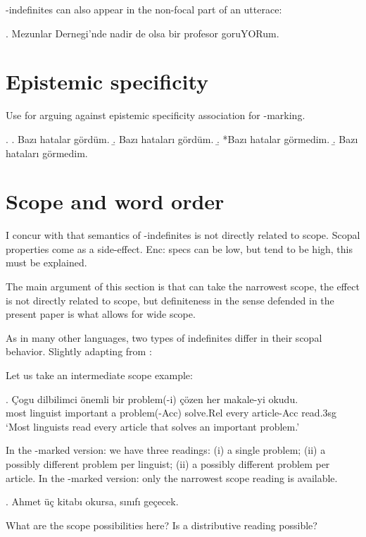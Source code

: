 \documentclass[11pt,a4paper]{article}
\begin{document}

\zero-indefinites can also appear in the non-focal part of an
utterace:

\ex.\label{exmezun}%
Mezunlar Dernegi'nde nadir de olsa bir profesor goruYORum.


\section{Epistemic specificity}

Use  for arguing against epistemic specificity
association for \acc-marking.


\ex.
\a. Bazı hatalar gördüm.
\b. Bazı hataları gördüm.
\b. *Bazı hatalar görmedim.
\b. Bazı hataları görmedim.


\section{Scope and word order}
\label{scscope}

I concur with \cite[3]{enc91} that semantics of \acc-indefinites is not
directly related to scope. Scopal properties come as a side-effect. 
Enc: specs can be low, but tend to be high, this must be explained.

The main argument of this section is that \acc can take the narrowest
scope, the effect is not directly related to scope, but definiteness
in the sense defended in the present paper is what allows for wide
scope.


As in many other languages, two types of indefinites differ in their
scopal behavior. Slightly adapting from :

Let us take an intermediate scope example:

\exg. Çogu dilbilimci önemli bir problem(-i) çözen her makale-yi okudu.\\
most linguist important a problem(-Acc) solve.Rel every article-Acc read.3sg\\
`Most linguists read every article that solves an important problem.'

In the \acc-marked version: we have three readings: (i) a single
problem; (ii) a possibly different problem per linguist; (ii) a
possibly different problem per article. In the \zero-marked version:
only the narrowest scope reading is available.


\ex. Ahmet üç kitabı okursa, sınıfı geçecek.

What are the scope possibilities here? Is a distributive reading
possible?
\end{document}
